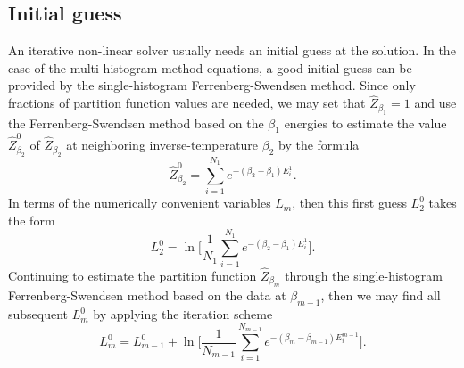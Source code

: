 \subsection{Initial guess}

An iterative non-linear solver usually needs an initial guess at the solution. In the case of the multi-histogram method equations,
a good initial guess can be provided by the single-histogram Ferrenberg-Swendsen
method. Since only fractions of partition function values are needed, we may set that $\hat{Z}_{\beta_1}=1$ and use the Ferrenberg-Swendsen method based on
the $\beta_1$ energies to estimate the value $\hat{Z}_{\beta_2}^0$ of $\hat{Z}_{\beta_2}$ at neighboring inverse-temperature $\beta_2$ by the formula
\begin{equation}
    \label{eq:Monte:Reweighting:MFS:guess:Zb2}
    \hat{Z}_{\beta_2}^0 = \sum_{i=1}^{N_1}e^{-(\beta_2-\beta_1)E^1_i}.
\end{equation}
In terms of the numerically convenient variables $L_m$, then this first guess $L_{2}^0$ takes the form
\begin{equation}
    \label{eq:Monte:Reweighting:MFS:guess:L2}
    L_{2}^0 = \ln\Big[\frac{1}{N_1}\sum_{i=1}^{N_1}e^{-(\beta_2-\beta_1)E_i^1}\Big].
\end{equation}
Continuing to estimate the partition function $\hat{Z}_{\beta_m}$ through the single-histogram Ferrenberg-Swendsen method based on the data at $\beta_{m-1}$,
then we may find all subsequent $L_{m}^0$ by applying the iteration scheme
\begin{equation}
    \label{eq:Monte:Reweighting:MFS:guess:LIteration}
    L_{m}^0 = L_{m-1}^0 + \ln\Big[\frac{1}{N_{m-1}}\sum_{i=1}^{N_{m-1}}e^{-(\beta_m-\beta_{m-1})E_i^{m-1}}\Big].
\end{equation}

